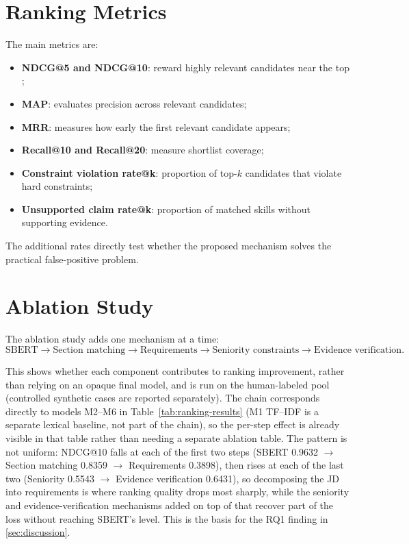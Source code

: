 \documentclass[12pt,a4paper,oneside]{report}
\begin{document}
\section{Ranking Metrics}
\label{sec:ranking-metrics}
The main metrics are:
\begin{itemize}
  \item \textbf{NDCG@5 and NDCG@10}: reward highly relevant candidates near the top \citep{jarvelin2002};
  \item \textbf{MAP}: evaluates precision across relevant candidates;
  \item \textbf{MRR}: measures how early the first relevant candidate appears;
  \item \textbf{Recall@10 and Recall@20}: measure shortlist coverage;
  \item \textbf{Constraint violation rate@k}: proportion of top-$k$ candidates that violate hard constraints;
  \item \textbf{Unsupported claim rate@k}: proportion of matched skills without supporting evidence.
\end{itemize}

The additional rates directly test whether the proposed mechanism solves the practical false-positive problem.

\section{Ablation Study}
The ablation study adds one mechanism at a time:
\begin{equation}
\text{SBERT} \rightarrow \text{Section matching} \rightarrow \text{Requirements} \rightarrow \text{Seniority constraints} \rightarrow \text{Evidence verification}.
\end{equation}

This shows whether each component contributes to ranking improvement, rather than relying on an opaque final model, and is run on the human-labeled pool (controlled synthetic cases are reported separately). The chain corresponds directly to models M2--M6 in Table~\ref{tab:ranking-results} (M1 TF--IDF is a separate lexical baseline, not part of the chain), so the per-step effect is already visible in that table rather than needing a separate ablation table. The pattern is not uniform: NDCG@10 falls at each of the first two steps (SBERT 0.9632 $\to$ Section matching 0.8359 $\to$ Requirements 0.3898), then rises at each of the last two (Seniority 0.5543 $\to$ Evidence verification 0.6431), so decomposing the JD into requirements is where ranking quality drops most sharply, while the seniority and evidence-verification mechanisms added on top of that recover part of the loss without reaching SBERT's level. This is the basis for the RQ1 finding in \cref{sec:discussion}.
\end{document}
